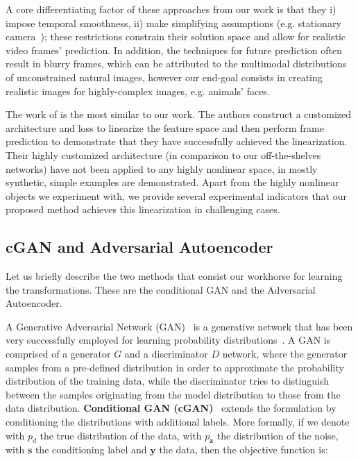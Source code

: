 \documentclass[10pt,twocolumn,letterpaper]{article}
\begin{document}
A core differentiating factor of these approaches from our work is that they i) impose temporal smoothness, ii) make simplifying assumptions (e.g. stationary camera~\cite{vondrick2016generating}); these restrictions constrain their solution space and allow for realistic video frames' prediction. In addition, the techniques for future prediction often result in blurry frames, which can be attributed to the multimodal distributions of unconstrained natural images, however our end-goal consists in creating realistic images for highly-complex images, e.g. animals' faces.

The work of \cite{goroshin2015learning} is the most similar to our work. The authors construct a customized architecture and loss to linearize the feature space and then perform frame prediction to demonstrate that they have successfully achieved the linearization. Their highly customized architecture (in comparison to our off-the-shelves networks) have not been applied to any highly nonlinear space, in \cite{goroshin2015learning} mostly synthetic, simple examples are demonstrated. Apart from the highly nonlinear objects we experiment with, we provide several experimental indicators that our proposed method achieves this linearization in challenging cases.


\subsection{cGAN and Adversarial Autoencoder}\label{sec:linear_dynamics_describe_networks}
Let us briefly describe the two methods that consist our workhorse for learning the transformations. These are the conditional GAN and the Adversarial Autoencoder.

A Generative Adversarial Network (GAN)~\cite{goodfellow2014generative} is a generative network that has been very successfully employed for learning probability distributions~\cite{ledig2016photo}. A GAN is comprised of a generator $G$ and a discriminator $D$ network, where the generator samples from a pre-defined distribution in order to approximate the probability distribution of the training data, while the discriminator tries to distinguish between the samples originating from the model distribution to those from the data distribution. 
\textbf{Conditional GAN (cGAN)}~\cite{mirza2014conditional} extends the formulation by conditioning the distributions with additional labels. More formally, if we denote with $p_{d}$ the true distribution of the data, with $p_{\bm{z}}$ the distribution of the noise, with $\bm{s}$ the conditioning label and $\bm{y}$ the data, then the objective function is: 
\end{document}
